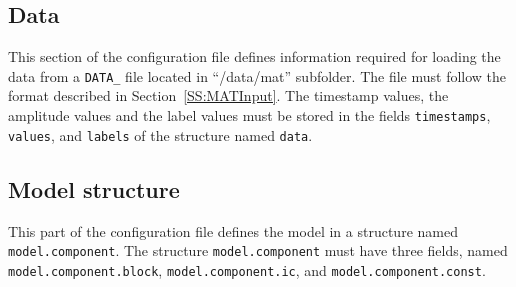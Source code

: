 \subsection{Data}

This section of the configuration file defines information required for loading the data from a \lstinline[basicstyle = \mlttfamily \small ]!DATA_! file located in ``/data/mat'' subfolder.
The file must follow the format described in Section~\ref{SS:MATInput}.
The timestamp values, the amplitude values and the label values must be stored in the fields \lstinline[basicstyle = \mlttfamily \small]!timestamps!, \lstinline[basicstyle = \mlttfamily \small]!values!, and \lstinline[basicstyle = \mlttfamily \small]!labels! of the \MATLAB{} structure named \lstinline[basicstyle = \mlttfamily \small]!data!.

\subsection{Model structure}
\label{SS:ModelComponents}
This part of the configuration file defines the model in a \MATLAB{} structure named \lstinline[basicstyle = \mlttfamily \small]!model.component!.
The structure \lstinline[basicstyle = \mlttfamily \small]!model.component! must have three fields, named \lstinline[basicstyle = \mlttfamily \small]!model.component.block!, \lstinline[basicstyle = \mlttfamily \small]!model.component.ic!, and \lstinline[basicstyle = \mlttfamily \small]!model.component.const!.

